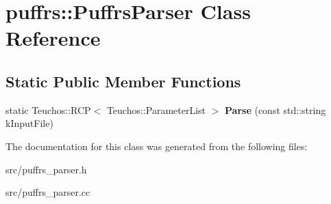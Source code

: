 \hypertarget{classpuffrs_1_1PuffrsParser}{}\section{puffrs\+:\+:Puffrs\+Parser Class Reference}
\label{classpuffrs_1_1PuffrsParser}
\subsection*{Static Public Member Functions}
\begin{DoxyCompactItemize}
\item 
\mbox{\label{classpuffrs_1_1PuffrsParser_aa41312817bfa20dc93e80790f51a720b}} 
static Teuchos\+::\+R\+CP$<$ Teuchos\+::\+Parameter\+List $>$ {\bfseries Parse} (const std\+::string k\+Input\+File)
\end{DoxyCompactItemize}


The documentation for this class was generated from the following files\+:\begin{DoxyCompactItemize}
\item 
src/puffrs\+\_\+parser.\+h\item 
src/puffrs\+\_\+parser.\+cc\end{DoxyCompactItemize}
